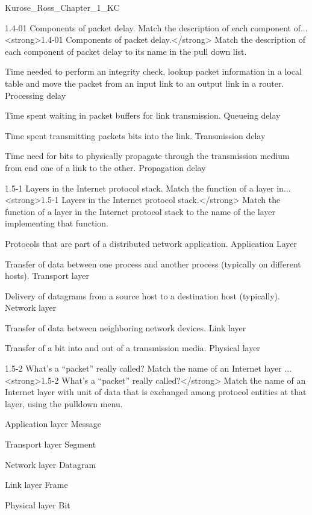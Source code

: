 \documentclass[a4paper]{article}
\begin{document}
\begin{quiz}{Kurose_Ross_Chapter_1_KC}
\begin{matching}[
	points=1,
	penalty=0.33333,
]{1.4-01 Components of packet delay. Match the description of each component of...}
<strong>1.4-01 Components of packet delay.</strong> Match the description of each component of packet delay to its name in the pull down list.
\item Time needed to perform an integrity check, lookup packet information in a local table and move the packet from an input link to an output link in a router. \answer Processing delay
\item Time spent waiting in packet buffers for link transmission. \answer Queueing delay
\item Time spent transmitting packets bits into the link. \answer Transmission delay
\item Time need for bits to physically propagate through the transmission medium from end one of a link to the other. \answer Propagation delay
\end{matching}

\begin{matching}[
	points=1,
	penalty=0.33333,
]{1.5-1 Layers in the Internet protocol stack. Match the function of a layer in...}
<strong>1.5-1 Layers in the Internet protocol stack.</strong> Match the function of a layer in the Internet protocol stack to the name of the layer implementing that function.
\item Protocols that are part of a distributed network application. \answer Application Layer
\item Transfer of data between one process and another process (typically on different hosts). \answer Transport layer
\item Delivery of datagrams from a source host to a destination host (typically). \answer Network layer
\item Transfer of data between neighboring network devices. \answer Link layer
\item Transfer of a bit into and out of a transmission media. \answer Physical layer
\end{matching}

\begin{matching}[
	points=1,
	penalty=0.33333,
]{1.5-2 What’s a “packet” really called? Match the name of an Internet layer ...}
<strong>1.5-2 What’s a “packet” really called?</strong> Match the name of an Internet layer with unit of data that is exchanged among protocol entities at that layer, using the pulldown menu.
\item Application layer \answer Message
\item Transport layer \answer Segment
\item Network layer \answer Datagram
\item Link layer \answer Frame
\item Physical layer \answer Bit
\end{matching}


\end{quiz}
\end{document}

